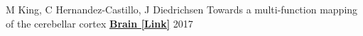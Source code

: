 \begin{cventries}
    
  \cventry
    {M King, C Hernandez-Castillo, J Diedrichsen} %
    {Towards a multi-function mapping of the cerebellar cortex} %
    {\href{https://academic.oup.com/brain/article/140/3/522/3053426?login=true}{\textbf{Brain [Link]}}} %
    {2017} %
   	{}
    
    
    
    

\end{cventries}


